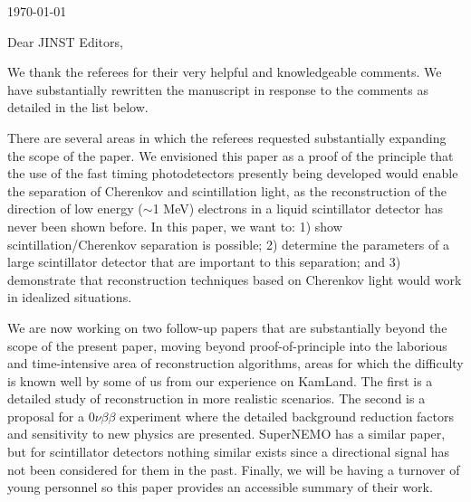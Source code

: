 \documentclass[11pt]{article}
\begin{document}
\begin{flushright}

\today

\end{flushright}




Dear JINST Editors,\\



\parindent 1.0in



We thank the referees for their very helpful and knowledgeable
comments. We have substantially rewritten the manuscript in response 
to the comments as detailed in the list below. 


There are several areas in which the referees requested
substantially expanding the scope of the paper.  We envisioned this
paper as a proof of  the principle that the use of the fast timing
photodetectors presently being developed would enable the separation
of Cherenkov and scintillation light, as the reconstruction of the
direction of low energy ($\sim$1 MeV) electrons in a liquid
scintillator detector has never been shown before.  In this paper, we
want to: 1) show scintillation/Cherenkov separation is possible; 2)
determine the parameters of a large scintillator detector that are
important to this separation; and 3) demonstrate that reconstruction
techniques based on Cherenkov light would work in idealized
situations.


We are now working on two follow-up papers that are substantially
beyond the scope of the present paper, moving beyond
proof-of-principle into the laborious and time-intensive area of
reconstruction algorithms, areas for which the difficulty is known
well by some of us from our experience on KamLand. The first is a
detailed study of reconstruction in more realistic scenarios. The
second is a proposal for a $0\nu\beta\beta$ experiment  where the detailed
background reduction factors and sensitivity to new physics are
presented. SuperNEMO has a similar paper, but for scintillator
detectors nothing similar exists since a directional signal has not
been considered for them in the past.  Finally, we will be having a
turnover of young personnel so this paper provides an accessible summary
of their work.





\parindent 3.0in
\end{document}
